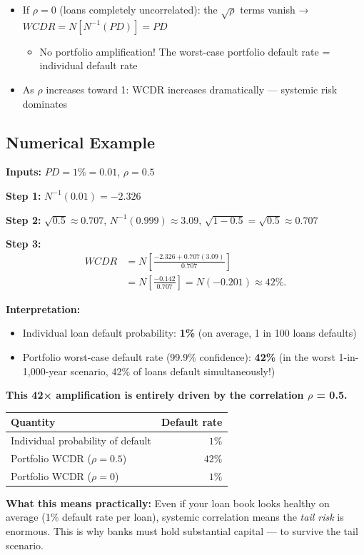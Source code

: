 \documentclass[12pt,openany]{book}
\theoremstyle{definition}
\theoremstyle{remark}
\begin{document}
\begin{itemize}
\item If $\rho = 0$ (loans completely uncorrelated): the $\sqrt{\rho}$ terms vanish → $WCDR = N[N^{-1}(PD)] = PD$

\begin{itemize}
\item No portfolio amplification! The worst-case portfolio default rate = individual default rate


\end{itemize}

\item As $\rho$ increases toward 1: WCDR increases dramatically --- systemic risk dominates


\end{itemize}
\medskip
\subsection{Numerical Example}
\textbf{Inputs:} $PD = 1\% = 0.01$, $\rho = 0.5$

\textbf{Step 1:} $N^{-1}(0.01) = -2.326$

\textbf{Step 2:} $\sqrt{0.5} \approx 0.707$, $N^{-1}(0.999) \approx 3.09$, $\sqrt{1-0.5} = \sqrt{0.5} \approx 0.707$

\textbf{Step 3:}
\[
\begin{aligned}
WCDR
&=N\!\left[\frac{-2.326+0.707(3.09)}{0.707}\right]\\
&=N\!\left[\frac{-0.142}{0.707}\right]
=N(-0.201)\approx42\%.
\end{aligned}
\]

\textbf{Interpretation:}

\begin{itemize}
\item Individual loan default probability: \textbf{1\%} (on average, 1 in 100 loans defaults)


\item Portfolio worst-case default rate (99.9\% confidence): \textbf{42\%} (in the worst 1-in-1,000-year scenario, 42\% of loans default simultaneously!)


\end{itemize}
\textbf{This 42× amplification is entirely driven by the correlation \(\rho\) = 0.5.}

\begin{center}
\begin{tabular}{@{}lr@{}}
\toprule
\textbf{Quantity} & \textbf{Default rate}\\
\midrule
Individual probability of default & $1\%$\\
Portfolio WCDR ($\rho=0.5$) & $42\%$\\
Portfolio WCDR ($\rho=0$) & $1\%$\\
\bottomrule
\end{tabular}
\end{center}
\textbf{What this means practically:} Even if your loan book looks healthy on average (1\% default rate per loan), systemic correlation means the \emph{tail risk} is enormous. This is why banks must hold substantial capital --- to survive the tail scenario.
\end{document}
